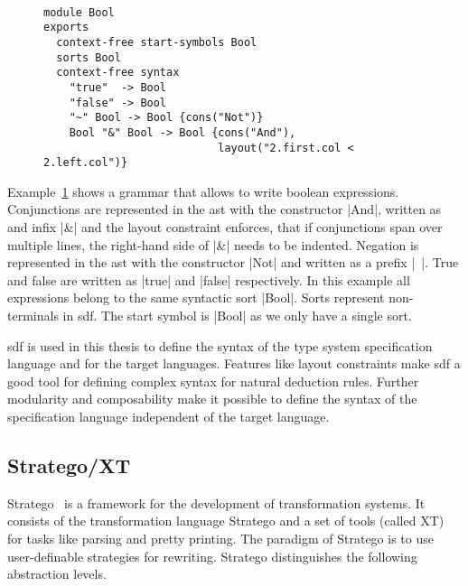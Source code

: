 \begin{figure}
\begin{example}{~}
\begin{lstlisting}[language=sdf]
module Bool
exports
  context-free start-symbols Bool
  sorts Bool
  context-free syntax
    "true"  -> Bool
    "false" -> Bool
    "~" Bool -> Bool {cons("Not")}
    Bool "&" Bool -> Bool {cons("And"),
                           layout("2.first.col < 2.left.col")}
\end{lstlisting}
\label{ex:sdf-grammar}
\end{example}
\end{figure}

Example~\ref{ex:sdf-grammar} shows a grammar that allows to write
boolean expressions. Conjunctions are represented in the \gls{ast}
with the constructor \code|And|, written as and infix \code|&| and the
layout constraint enforces, that if conjunctions span over multiple
lines, the right-hand side of \code|&| needs to be indented. Negation
is represented in the \gls{ast} with the constructor \code|Not| and
written as a prefix \code|~|. True and false are written as
\code|true| and \code|false| respectively. In this example all
expressions belong to the same syntactic sort \code|Bool|. Sorts
represent non-terminals in \gls{sdf}. The start symbol is \code|Bool|
as we only have a single sort.

\gls{sdf} is used in this thesis to define the syntax of the type
system specification language and for the target languages.  Features like
layout constraints make \gls{sdf} a good tool for defining complex
syntax for natural deduction rules. Further modularity and
composability make it possible to define the syntax of the
specification language independent of the target language.

\subsection{Stratego/XT}
Stratego~\cite{Visser01} is a framework for the development of
transformation systems. It consists of the transformation language
Stratego and a set of tools (called XT) for tasks like parsing and
pretty printing. The paradigm of Stratego is to use user-definable
strategies for rewriting. Stratego distinguishes the following
abstraction levels.

